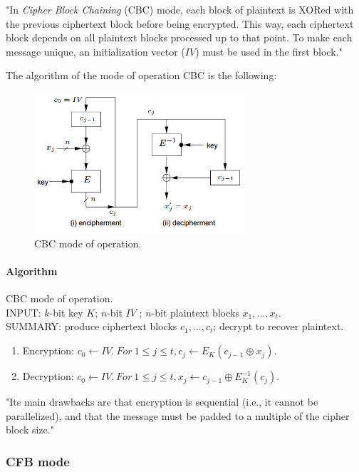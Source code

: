 \documentclass[a4paper,12pt,titlepage]{article}
\begin{document}
"In \textit{Cipher Block Chaining} (CBC) mode, each block of plaintext is XORed with the previous ciphertext block before being encrypted. This way, each ciphertext block depends on all plaintext blocks processed up to that point. To make each message unique, an initialization vector ($IV$) must be used in the first block." \citep{wiki:mode-operation}

The algorithm of the mode of operation CBC is the following:

\begin{figure}[!ht]
	\centering
	\label{fig:cbc}
	\includegraphics[width=0.7\textwidth]{cbc.png}
	\caption{CBC mode of operation. \citep{menezes_handbook_1996}}
\end{figure}

\paragraph{Algorithm}
CBC mode of operation. \citep{menezes_handbook_1996} \\
INPUT: $k$-bit key $K$; $n$-bit $IV$ ; $n$-bit plaintext blocks $x_1, ... , x_t$. \\
SUMMARY: produce ciphertext blocks $c_1, ... , c_t$; decrypt to recover plaintext.
\begin{enumerate}[noitemsep]
\item Encryption: $c_0 \leftarrow IV.\ For\ 1 \le j \le t, c_j \leftarrow E_K(c_{j-1} \oplus x_j)$.
\item Decryption: $c_0 \leftarrow IV.\ For\ 1 \le j \le t, x_j \leftarrow c_{j-1} \oplus E_{K}^{-1}(c_j)$.
\end{enumerate}

"Its main drawbacks are that encryption is sequential (i.e., it cannot be parallelized), and that the message must be padded to a multiple of the cipher block size." \citep{wiki:mode-operation}

\subsubsection{CFB mode}
\end{document}
